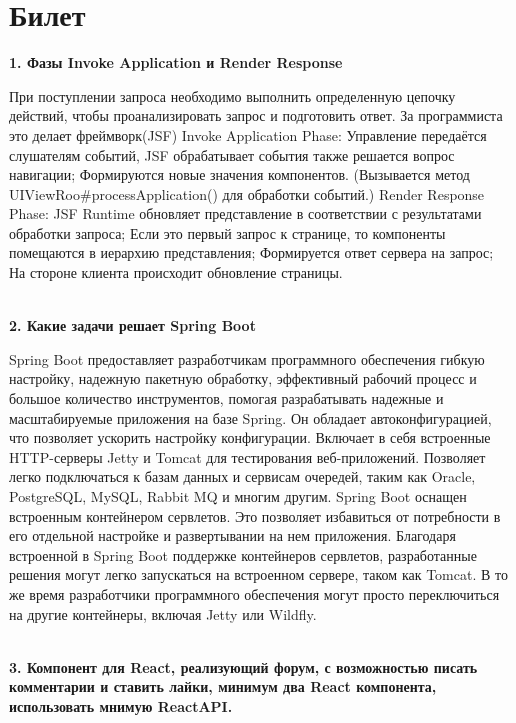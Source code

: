 \documentclass{article}
\newcommand{\bil}[5]{%
        \section{Билет}
        \textbf{1. #1}

        #4
        \\
        \textbf{2. #2}
        
        #5
        \\
        \textbf{3. #3}
}
\begin{document}
\bil{Фазы Invoke Application и Render Response}{Какие задачи решает Spring Boot}{Компонент для React, реализующий форум, с возможностью писать комментарии и ставить лайки, минимум два React компонента, использовать мнимую ReactAPI.}{
    При поступлении запроса необходимо выполнить определенную цепочку действий, 
    чтобы проанализировать запрос и подготовить ответ. 
    За программиста это делает фреймворк(JSF) Invoke Application Phase: 
    Управление передаётся слушателям событий, JSF обрабатывает события также решается вопрос навигации; 
    Формируются новые значения компонентов. (Вызывается метод UIViewRoo\#processApplication() для обработки событий.) 
    Render Response Phase: JSF Runtime обновляет представление в соответствии с результатами обработки запроса; 
    Если это первый запрос к странице, то компоненты помещаются в иерархию представления; 
    Формируется ответ сервера на запрос; На стороне клиента происходит обновление страницы.
}{
    Spring Boot предоставляет разработчикам программного обеспечения гибкую настройку, надежную пакетную обработку, эффективный рабочий процесс и большое количество инструментов, 
    помогая разрабатывать надежные и масштабируемые приложения на базе Spring.
    Он обладает автоконфигурацией, что позволяет ускорить настройку конфигурации.
    Включает в себя встроенные HTTP-серверы Jetty и Tomcat для тестирования веб-приложений. Позволяет легко подключаться к базам данных и сервисам очередей, таким как Oracle, PostgreSQL, MySQL, Rabbit MQ и многим другим.
    Spring Boot оснащен встроенным контейнером сервлетов. Это позволяет избавиться от потребности в его отдельной настройке и развертывании на нем приложения. Благодаря встроенной в Spring Boot поддержке контейнеров сервлетов, разработанные решения могут легко запускаться на встроенном сервере, таком как Tomcat. В то же время разработчики программного обеспечения могут просто переключиться на другие контейнеры, включая Jetty или Wildfly.
}
\end{document}
